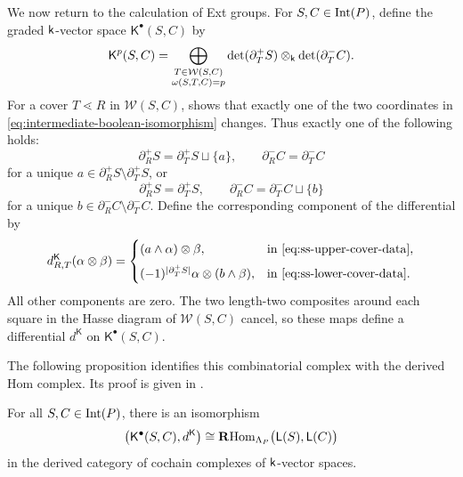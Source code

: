 We now return to the calculation of Ext groups. 
For $S,C\in\operatorname{Int}(P)$, define the graded $\mathsf{k}$-vector space
$\mathsf K^\bullet(S,C)$ by
\begin{equation}
\label{eq:simple-simple-combinatorial-complex}
\mathsf K^p(S,C)
=
\bigoplus_{\substack{
T\in\mathcal W(S,C)\\
\omega(S,T,C)=p}}
\det(\partial_T^+S)
\otimes_{\mathsf{k}}
\det(\partial_T^-C).
\end{equation}
For a cover $T\lessdot R$ in $\mathcal W(S,C)$,
 shows that exactly one of
the two coordinates in
\eqref{eq:intermediate-boolean-isomorphism} changes.  Thus exactly one
of the following holds:
\begin{equation}
\label{eq:ss-upper-cover-data}
\partial_R^+S
=
\partial_T^+S\sqcup\{a\},
\qquad
\partial_R^-C
=
\partial_T^-C
\end{equation}
for a unique $a\in\partial_R^+S\setminus\partial_T^+S$, or
\begin{equation}
\label{eq:ss-lower-cover-data}
\partial_R^+S
=
\partial_T^+S,
\qquad
\partial_R^-C
=
\partial_T^-C\sqcup\{b\}
\end{equation}
for a unique $b\in\partial_R^-C\setminus\partial_T^-C$.
Define the corresponding component of the differential by
\begin{equation}
\label{eq:simple-simple-combinatorial-differential}
d^{\mathsf K}_{R,T}(\alpha\otimes\beta)
=
\begin{cases}
(a\wedge\alpha)\otimes\beta,
&
\text{in \eqref{eq:ss-upper-cover-data}},
\\[2mm]
(-1)^{|\partial_T^+S|}
\alpha\otimes(b\wedge\beta),
&
\text{in \eqref{eq:ss-lower-cover-data}}.
\end{cases}
\end{equation}
All other components are zero. 
The two length-two composites around each square in the Hasse diagram of $\mathcal W(S,C)$ cancel, so these maps define a differential
$d^{\mathsf K}$ on $\mathsf K^\bullet(S,C)$.


The following proposition identifies this combinatorial complex with
the derived Hom complex.  Its proof is given in
.

\begin{proposition}
\label{prop:simple-simple-combinatorial-model}
For all $S,C\in\operatorname{Int}(P)$, there is an isomorphism
\begin{equation}
\label{eq:simple-simple-derived-combinatorial-model}
\bigl(\mathsf K^\bullet(S,C),d^{\mathsf K}\bigr)
\cong
\mathbf R\!\operatorname{Hom}_{\Lambda_P}\bigl(\mathsf L(S),\mathsf L(C)\bigr)
\end{equation}
in the derived category of cochain complexes of $\mathsf{k}$-vector spaces.
\end{proposition}

